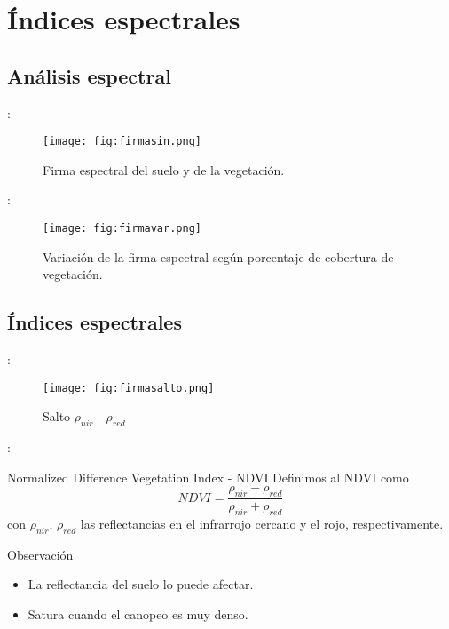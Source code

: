 \section{Índices espectrales}
\subsection{Análisis espectral}

\begin{frame}{\secname : \subsecname}
  \begin{figure}
    \centering
    \texttt{[image: fig:firmasin.png]}
    \caption{Firma espectral del suelo y de la vegetación.}
    \label{}
  \end{figure}
\end{frame}

\begin{frame}{\secname : \subsecname}
  \begin{figure}
    \centering
    \texttt{[image: fig:firmavar.png]}
    \caption{Variación de la firma espectral según porcentaje de cobertura de vegetación.}
    \label{}
  \end{figure}
\end{frame}

\subsection{Índices espectrales}

\begin{frame}{\secname : \subsecname}
  \begin{figure}
    \centering
    \texttt{[image: fig:firmasalto.png]}
    \caption{Salto $\rho_{nir}$ - $\rho_{red}$}
    \label{}
  \end{figure}
\end{frame}


\begin{frame}{\secname : \subsecname}
\begin{block}{Normalized Difference Vegetation Index - NDVI}
  Definimos al NDVI como
  \begin{equation}
    NDVI = \frac{\rho_{nir}-\rho_{red}}{\rho_{nir}+\rho_{red}}
  \end{equation}
  con $\rho_{nir}$, $\rho_{red}$ las reflectancias en el infrarrojo cercano y el rojo, respectivamente.
\end{block}
\begin{block}{Observación}
    \begin{itemize}[<+->]
        \item La reflectancia del suelo lo puede afectar.
        \item Satura cuando el canopeo es muy denso.
    \end{itemize}
\end{block}
\end{frame}

